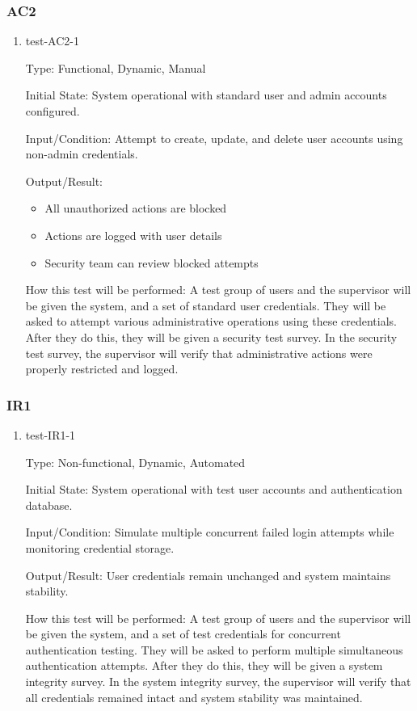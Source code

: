 \documentclass[12pt, titlepage]{article}
\begin{document}
\subsubsection{AC2}

\begin{enumerate}
    \item{test-AC2-1}  \label{test-AC2-1}
    
    Type: Functional, Dynamic, Manual
    
    Initial State: System operational with standard user and admin accounts configured.
    
    Input/Condition: Attempt to create, update, and delete user accounts using non-admin credentials.
    
    Output/Result:
    \begin{itemize}
        \item All unauthorized actions are blocked
        \item Actions are logged with user details
        \item Security team can review blocked attempts
    \end{itemize}
    
    How this test will be performed: A test group of users and the supervisor will be given the system, and a set of standard user credentials. They will be asked to attempt various administrative operations using these credentials. After they do this, they will be given a security test survey. In the security test survey, the supervisor will verify that administrative actions were properly restricted and logged.

\end{enumerate}

\subsubsection{IR1}

\begin{enumerate}

    \item{test-IR1-1}  \label{test-IR1-1}
    
    Type: Non-functional, Dynamic, Automated
    
    Initial State: System operational with test user accounts and authentication database.
    
    Input/Condition: Simulate multiple concurrent failed login attempts while monitoring credential storage.
    
    Output/Result: User credentials remain unchanged and system maintains stability.
    
    How this test will be performed: A test group of users and the supervisor will be given the system, and a set of test credentials for concurrent authentication testing. They will be asked to perform multiple simultaneous authentication attempts. After they do this, they will be given a system integrity survey. In the system integrity survey, the supervisor will verify that all credentials remained intact and system stability was maintained.

  \end{enumerate}
\end{document}
